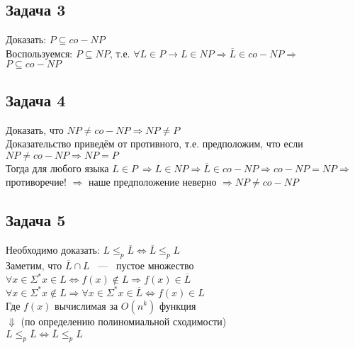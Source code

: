 \documentclass[12pt]{report}
\begin{document}
	\subsection*{Задача 3}
		Доказать: $P \subseteq co-NP$\\
		Воспользуемся: $P \subseteq NP$, т.е. $\forall L \in P \rightarrow L \in NP \Rightarrow \overline{L} \in co-NP \Rightarrow$\\
		$P \subseteq co-NP$\\
		
	\subsection*{Задача 4}
		Доказать, что $NP \neq co-NP \Rightarrow NP \neq P$\\
		Доказательство приведём от противного, т.е. предположим, что если $NP \neq co-NP \Rightarrow NP = P$ \\
		Тогда для любого языка $L \in P \ \Rightarrow L \in NP \Rightarrow \overline{L} \in co-NP \Rightarrow co-NP = NP \Rightarrow$ противоречие! $\Rightarrow$ наше предположение неверно $\Rightarrow NP \neq co-NP$  		
	\subsection*{Задача 5}
	Необходимо доказать: $L \leq_{p} \overline{L} \Leftrightarrow \overline{L} \leq_{p} L$\\
	Заметим, что $\overline{L} \cap L$ ~---~ пустое множество \\
	$\forall x \in \Sigma^{*} x \in L \Leftrightarrow f(x) \notin L \Longrightarrow f(x) \in \overline{L}$\\
	$\forall x \in \Sigma^{*} x \notin L \Longrightarrow \forall x \in \Sigma^{*} x \in \overline{L} \Leftrightarrow f(x) \in L$\\
	Где $f(x)$ вычислимая за $O(n^{k})$ функция\\
	$\Downarrow$ (по определению полиномиальной сходимости)\\
	$L \leq_{p} \overline{L} \Leftrightarrow \overline{L} \leq_{p} L$	 
\end{document}
